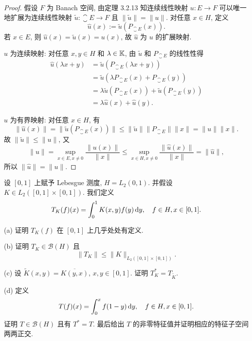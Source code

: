 \begin{proof}
    假设 $F$ 为 Banach 空间, 由定理 3.2.13 知连续线性映射 $u:E\to F$
    可以唯一地扩展为连续线性映射 $\tilde{u}:\closure{E}\to F$ 且 $\|\tilde{u}\|=\|u\|$.
    对任意 $x\in H$, 定义
    \[\hat{u}(x):=\tilde{u}\left(P_{\closure{E}}(x)\right).\]
    若 $x\in E$, 则 $\hat{u}(x)=\tilde{u}(x)=u(x)$, 故 $\hat{u}$
    为 $u$ 的扩展映射.

    $\hat{u}$ 为连续映射: 对任意 $x,y\in H$ 和 $\lambda\in\mathbb{K}$,
    由 $\tilde{u}$ 和 $P_{\closure{E}}$ 的线性性得
    \begin{align*}
        \hat{u}(\lambda x+y)
        & =\tilde{u}(P_{\closure{E}}(\lambda x+y)) \\
        & =\tilde{u}(\lambda P_{\closure{E}}(x)+P_{\closure{E}}(y)) \\
        & =\lambda\tilde{u}(P_{\closure{E}}(x))+\tilde{u}(P_{\closure{E}}(y)) \\
        & =\lambda\hat{u}(x)+\hat{u}(y).
    \end{align*}

    $\hat{u}$ 为有界映射: 对任意 $x\in H$, 有
    \[\|\hat{u}(x)\|=\|\tilde{u}(P_{\closure{E}}(x))\|\leq\|\tilde{u}\|\|P_{\closure{E}}\|\|x\|=\|u\|\|x\|.\]
    故 $\|\tilde{u}\|\leq\|u\|$, 又
    \[\|u\|=\sup_{x\in E,x\neq 0}\frac{\|u(x)\|}{\|x\|}\leq\sup_{x\in H,x\neq 0}\frac{\|\hat{u}(x)\|}{\|x\|}=\|\hat{u}\|,\]
    所以 $\|\hat{u}\|=\|u\|$.
\end{proof}



\begin{exercise}
    设 $[0,1]$ 上赋予 Lebesgue 测度, $H=L_{2}(0,1)$. 并假设 $K \in L_{2}([0,1] \times[0,1])$. 我们定义
    \[
    T_{K}(f)(x)=\int_{0}^{1} K(x, y) f(y)\mathop{}\!\mathrm{d} y, \quad f \in H, x \in[0,1].
    \]

    (a) 证明 $T_{K}(f)$ 在 $[0,1]$ 上几乎处处有定义.

    (b) 证明 $T_{K} \in\mathcal{B}(H)$ 且
    \[
    \left\|T_{K}\right\|\leq\|K\|_{L_{2}([0,1] \times[0,1])}.
    \]

    (c) 设 $\widetilde{K}(x, y)=\overline{K(y, x)}$, $x,y\in[0,1]$. 证明 $T_{K}^{*}=T_{\tilde{K}}$.

    (d) 定义
    \[
    T(f)(x)=\int_{0}^{x} f(1-y)\mathop{}\!\mathrm{d} y, \quad f \in H, x \in[0,1].
    \]
    证明 $T\in\mathcal{B}(H)$ 且有 $T^{*}=T$.
    最后给出 $T$ 的非零特征值并证明相应的特征子空间两两正交.
\end{exercise}

